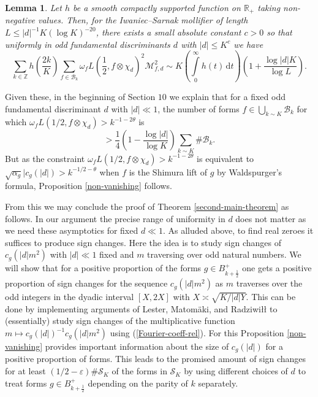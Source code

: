 \documentclass[a4paper,10pt,twoside]{amsart}
\newtheorem{lemma}[theorem]{Lemma}
\theoremstyle{definition}
\numberwithin{equation}{section}
\newcommand\Z{\mathbb{Z}}
\newcommand\eps{\varepsilon}
\renewcommand\:{\colon}
\begin{document}
\begin{lemma}\label{fourth-moment}
Let $h$ be a smooth compactly supported function on $\mathbb R_+$ taking non-negative values. Then, for the Iwaniec--Sarnak mollifier of length $L\leq |d|^{-1}K(\log K)^{-20}$, there exists a small absolute constant $c>0$ so that uniformly in odd fundamental discriminants $d$ with $|d|\leq K^c$ we have
\[\sum_{k\in\Z}h\left(\frac{2k}K\right)\sum_{f\in \mathcal B_k}\omega_fL\left(\frac12,f\otimes\chi_d\right)^2\mathcal M_{f,d}^2\sim K\left(\int\limits_0^\infty h(t)\,\mathrm d t\right)\left(1+\frac{\log |d|K}{\log L} \right).\]
\end{lemma}
\noindent Given these, in the beginning of Section $10$ we explain that for a fixed odd fundamental discriminant $d$ with $|d|\ll 1$, the number of forms $f\in\bigcup_{k\sim K} \mathcal B_{k}$ for which $\omega_f L(1/2,f\otimes\chi_d)> k^{-1-2\theta}$ is 
\[> \frac{1}{4}\left(1-\frac{\log |d|}{\log K}\right)\sum_{k\sim K}\#\mathcal B_k.\]
But as the constraint $\omega_f L(1/2,f\otimes\chi_d)>k^{-1-2\theta}$ is equivalent to $\sqrt{\alpha_g}|c_g(|d|)>k^{-1/2-\theta}$ when $f$ is the Shimura lift of $g$ by Waldspurger's formula, Proposition \ref{non-vanishing} follows. 

From this we may conclude the proof of Theorem \ref{second-main-theorem} as follows. In our argument the precise range of uniformity in $d$ does not matter as we need these asymptotics for fixed $d\ll 1$. As alluded above, to find real zeroes it suffices to produce sign changes. Here the idea is to study sign changes of $c_g(|d|m^2)$ with $|d|\ll 1$ fixed and $m$ traversing over odd natural numbers. We will show that for a positive proportion of the forms $g\in B_{k+\frac12}^+$ one gets a positive proportion of sign changes for the sequence $c_g(|d|m^2)$ as $m$ traverses over the odd integers in the dyadic interval $[X,2X]$ with $X\asymp\sqrt{K/|d|Y}$. This can be done by implementing arguments of Lester, Matom\"aki, and Radziwi{\l\l} \cite{Lester-Matomaki-Radziwill2018} to (essentially) study sign changes of the multiplicative function $m\mapsto c_g(|d|)^{-1}c_g(|d|m^2)$ using (\ref{Fourier-coeff-rel}). For this Proposition \ref{non-vanishing} provides important information about the size of $c_g(|d|)$ for a positive proportion of forms. This leads to the promised amount of sign changes for at least $(1/2-\eps)\#\mathcal S_K$ of the forms in $\mathcal S_K$ by using different choices of $d$ to treat forms $g\in B_{k+\frac12}^+$ depending on the parity of $k$ separately. 
\end{document}
